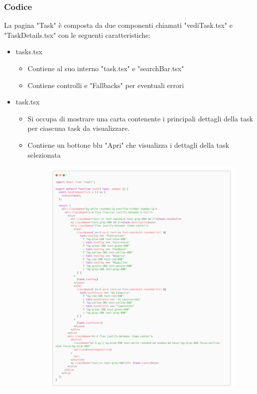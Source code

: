 \documentclass{report}
\begin{document}
\subsubsection*{Codice}
La pagina "Task" è composta da due componenti chiamati "vediTask.tsx" e "TaskDetails.tsx" con le seguenti caratteristiche:
\begin{itemize}
	\item tasks.tsx
	\begin{itemize}
		\item Contiene al suo interno "task.tsx" e "searchBar.tsx"
		\item Contiene controlli e "Fallbacks" per eventuali errori
	\end{itemize}
	\item task.tsx
	\begin{itemize}
		\item Si occupa di mostrare una carta contenente i principali dettagli della task per ciascuna task da visualizzare.
		\item Contiene un bottone blu "Apri" che visualizza i dettagli della task selezionata
		\begin{figure}[H]
			\centering\includegraphics[width=1\textwidth]{images/microservizio-task/frontend/task-carbon.png}

\end{figure}
\end{itemize}
\end{itemize}
\end{document}
